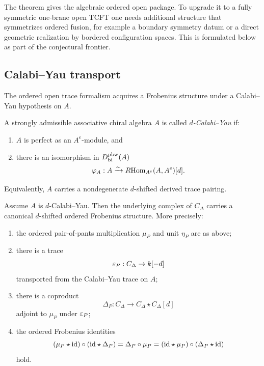 \begin{remark}
The theorem gives the algebraic ordered open package. To upgrade it to a fully symmetric
one-brane open TCFT one needs additional structure that symmetrizes ordered fusion, for example a
boundary symmetry datum or a direct geometric realization by bordered configuration spaces.
This is formulated below as part of the conjectural frontier.
\end{remark}

\subsection{Calabi--Yau transport}

The ordered open trace formalism acquires a Frobenius structure under a Calabi--Yau hypothesis on
$A$.

\begin{definition}
A strongly admissible associative chiral algebra $A$ is called \emph{$d$-Calabi--Yau} if:
\begin{enumerate}[label=(\alph*)]
\item $A$ is perfect as an $A^e$-module, and
\item there is an isomorphism in $D^{\mathrm{pbw}}_{\mathrm{bi}}(A)$
\[
\varphi_A:A\xrightarrow{\sim}R\!\operatorname{Hom}_{A^e}(A,A^e)[d].
\]
\end{enumerate}
Equivalently, $A$ carries a nondegenerate $d$-shifted derived trace pairing.
\end{definition}

\begin{theorem}
Assume $A$ is $d$-Calabi--Yau. Then the underlying complex of $C_\Delta$ carries a canonical
$d$-shifted ordered Frobenius structure. More precisely:
\begin{enumerate}[label=(\roman*)]
\item the ordered pair-of-pants multiplication $\mu_P$ and unit $\eta_P$ are as above;
\item there is a trace
\[
\varepsilon_P:C_\Delta\to k[-d]
\]
transported from the Calabi--Yau trace on $A$;
\item there is a coproduct
\[
\Delta_P:C_\Delta\to C_\Delta\star C_\Delta[d]
\]
adjoint to $\mu_P$ under $\varepsilon_P$;
\item the ordered Frobenius identities
\[
(\mu_P\star \mathrm{id})\circ(\mathrm{id}\star \Delta_P)
=
\Delta_P\circ \mu_P
=
(\mathrm{id}\star\mu_P)\circ(\Delta_P\star \mathrm{id})
\]
hold.
\end{enumerate}
\end{theorem}

